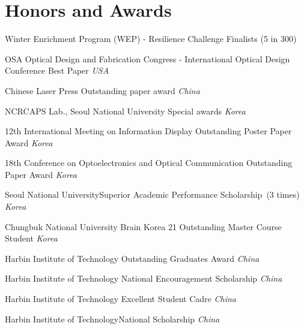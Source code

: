 \documentclass[10pt,a4paper]{moderncv}
\begin{document}
\section{Honors and Awards}
{Winter Enrichment Program (WEP) - Resilience Challenge}
{Finalists (5 in 300)}
{}{\textit{}}{}

{OSA Optical Design and Fabrication Congress - International Optical Design Conference}
{Best Paper}
{}{\textit{USA}}{}

{Chinese Laser Press}
{Outstanding paper award}
{}{\textit{China}}{}

{NCRCAPS Lab., Seoul National University}
{Special awards}
{}{\textit{Korea}}{}

{12th International Meeting on Information Display}
{Outstanding Poster Paper Award}
{}{\textit{Korea}}{}

{18th Conference on Optoelectronics and Optical Communication}
{Outstanding Paper Award}
{}{\textit{Korea}}{}

{Seoul National University}{Superior Academic Performance Scholarship~(3 times)}
{}{\textit{Korea}}{}

{Chungbuk National University}
{Brain Korea 21 Outstanding Master Course Student}
{}{\textit{Korea}}{}

{Harbin Institute of Technology}
{Outstanding Graduates Award}
{}{\textit{China}}{}

{Harbin Institute of Technology}
{National Encouragement Scholarship}
{}{\textit{China}}{}


{Harbin Institute of Technology}
{Excellent Student Cadre}
{}{\textit{China}}{}

{Harbin Institute of Technology}{National Scholarship}
{}{\textit{China}}{}


\end{document}
